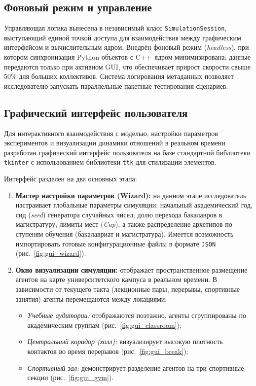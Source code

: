 \documentclass[12pt]{article}
\begin{document}
\subsection{Фоновый режим и управление}
Управляющая логика вынесена в независимый класс \texttt{SimulationSession}, выступающий единой точкой доступа для взаимодействия между графическим интерфейсом и вычислительным ядром. Внедрён фоновый режим (\textit{headless}), при котором синхронизация Python-объектов с C++~ядром минимизирована: данные передаются только при активном GUI, что обеспечивает прирост скорости свыше 50\% для больших коллективов. Система логирования метаданных позволяет исследователю запускать параллельные пакетные тестирования сценариев.

\subsection{Графический интерфейс пользователя}

Для интерактивного взаимодействия с моделью, настройки параметров экспериментов и визуализации динамики отношений в реальном времени разработан графический интерфейс пользователя на базе стандартной библиотеки \texttt{tkinter} с использованием библиотеки \texttt{ttk} для стилизации элементов.

Интерфейс разделен на два основных этапа:
\begin{enumerate}
    \item \textbf{Мастер настройки параметров (Wizard):} на данном этапе исследователь настраивает глобальные параметры симуляции: начальный академический год, сид (\textit{seed}) генератора случайных чисел, долю перехода бакалавров в магистратуру, лимиты мест (\textit{Cap}), а также распределение архетипов по ступеням обучения (бакалавриат и магистратура). Имеется возможность импортировать готовые конфигурационные файлы в формате \texttt{JSON} (рис.~\ref{fig:gui_wizard}).
    \item \textbf{Окно визуализации симуляции:} отображает пространственное размещение агентов на карте университетского кампуса в реальном времени. В зависимости от текущего такта (лекционные пары, перерывы, спортивные занятия) агенты перемещаются между локациями:
    \begin{itemize}
        \item \textit{Учебные аудитории:} отображаются поэтажно, агенты сгруппированы по академическим группам (рис.~\ref{fig:gui_classroom});
        \item \textit{Центральный коридор (холл):} визуализирует высокую плотность контактов во время перерывов (рис.~\ref{fig:gui_break});
        \item \textit{Спортивный зал:} демонстрирует разделение агентов на три спортивные секции (рис.~\ref{fig:gui_gym}).
    \end{itemize}
\end{enumerate}
\end{document}
